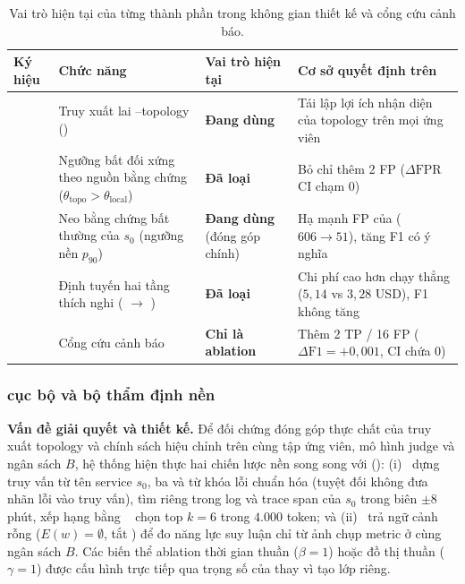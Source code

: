 \begin{table}[H]
  \centering
  \caption{Vai trò hiện tại của từng thành phần trong không gian thiết kế \CTAV{} và cổng cứu cảnh báo.}
  \label{tab:ch4-c1-c5}
  \tblfont
  \tblsetup
  \begin{tabularx}{\linewidth}{|l|Y|>{\raggedright\arraybackslash}p{2.7cm}|Y|}
    \hline
    \textbf{Ký hiệu} & \textbf{Chức năng} & \textbf{Vai trò hiện tại} & \textbf{Cơ sở quyết định trên } \\
    \hline
    \textbf{} & Truy xuất lai --topology () & \textbf{Đang dùng} & Tái lập lợi ích nhận diện của topology trên mọi ứng viên \\
    \hline
    \textbf{} & Ngưỡng bất đối xứng theo nguồn bằng chứng ($\theta_{\text{topo}} > \theta_{\text{local}}$) & \textbf{Đã loại} & Bỏ  chỉ thêm 2 FP ($\Delta\text{FPR}$ CI chạm $0$) \\
    \hline
    \textbf{} & Neo bằng chứng bất thường của $s_0$ (ngưỡng nền  $p_{90}$) & \textbf{Đang dùng} (đóng góp chính) & Hạ mạnh FP của  ($606 \to 51$), tăng F1 có ý nghĩa \\
    \hline
    \textbf{} & Định tuyến hai tầng thích nghi ( $\to$ ) & \textbf{Đã loại} & Chi phí cao hơn  chạy thẳng ($5{,}14$ vs $3{,}28$ USD), F1 không tăng \\
    \hline
    \textbf{} & Cổng cứu cảnh báo  & \textbf{Chỉ là ablation} & Thêm 2 TP / 16 FP ($\Delta\text{F1} = +0{,}001$, CI chứa $0$) \\
    \hline
  \end{tabularx}
\end{table}

\subsubsection{ cục bộ và bộ thẩm định nền}
\label{sec:ch4-bm25}

\textbf{Vấn đề giải quyết và thiết kế.} Để đối chứng đóng góp thực chất của truy xuất topology và chính sách hiệu chỉnh trên cùng tập ứng viên, mô hình judge và ngân sách $B$, hệ thống hiện thực hai chiến lược nền song song với  (): (i)~ dựng truy vấn từ tên service $s_0$, ba  và từ khóa lỗi chuẩn hóa (tuyệt đối không đưa nhãn lỗi vào truy vấn), tìm riêng trong log và trace span của $s_0$ trong biên $\pm 8$ phút, xếp hạng bằng ~\cite{robertson2009bm25} chọn top $k = 6$ trong $4.000$ token; và (ii)~ trả ngữ cảnh rỗng ($E(w) = \emptyset$, tắt ) để đo năng lực suy luận chỉ từ ảnh chụp metric ở cùng ngân sách $B$. Các biến thể ablation thời gian thuần ($\beta = 1$) hoặc đồ thị thuần ($\gamma = 1$) được cấu hình trực tiếp qua trọng số của  thay vì tạo lớp riêng.


